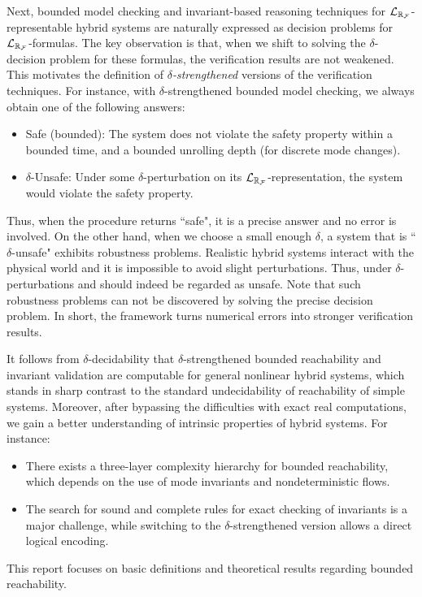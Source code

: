 \documentclass[12pt]{article}
\begin{document}
Next, bounded model checking and invariant-based reasoning techniques for $\mathcal{L}_{\mathbb{R}_{\mathcal{F}}}$-representable hybrid systems are naturally expressed as decision problems for $\mathcal{L}_{\mathbb{R}_{\mathcal{F}}}$-formulas. The key observation is that, when we shift to solving the $\delta$-decision problem for these formulas, the verification results are not weakened. This motivates the definition of {\em $\delta$-strengthened} versions of the verification techniques. For instance, with $\delta$-strengthened bounded model checking, we always obtain one of the following answers:
\begin{itemize}
\item {Safe} (bounded): The system does not violate the safety property within a bounded time, and a bounded unrolling depth (for discrete mode changes). 
\item {$\delta$-Unsafe}: Under some $\delta$-perturbation on its $\mathcal{L}_{\mathbb{R}_{\mathcal{F}}}$-representation, the system would violate the safety property. 
\end{itemize}
Thus, when the procedure returns ``safe", it is a precise answer and no error is involved. On the other hand, when we choose a small enough $\delta$, a system that is ``$\delta$-unsafe" exhibits robustness problems. Realistic hybrid systems interact with the physical world and it is impossible to avoid slight perturbations. Thus, under $\delta$-perturbations and should indeed be regarded as unsafe. Note that such robustness problems can not be discovered by solving the precise decision problem. In short, the framework turns numerical errors into stronger verification results. 

It follows from $\delta$-decidability that $\delta$-strengthened bounded reachability and invariant validation are computable for general nonlinear hybrid systems, which stands in sharp contrast to the standard undecidability of reachability of simple systems. Moreover, after bypassing the difficulties with exact real computations, we gain a better understanding of intrinsic properties of hybrid systems. For instance:
\begin{itemize}
\item There exists a three-layer complexity hierarchy for bounded reachability, which depends on the use of mode invariants and nondeterministic flows. 
\item The search for sound and complete rules for exact checking of invariants is a major challenge, while switching to the $\delta$-strengthened version allows a direct logical encoding. 
\end{itemize} 
This report focuses on basic definitions and theoretical results regarding bounded reachability.
\end{document}
